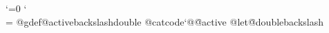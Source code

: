 \outer\def\bye{\pagealignmacro\tracingstats=1\ptexend}


\newcount\tempnum
\newcount\lnkcount
\newtoks\filename
\newcount\filenamelength
\newcount\pgn
\newtoks\toksA
\newtoks\toksB
\newtoks\toksC
\newtoks\toksD
\newbox\boxA
\newcount\countA
\newif\ifpdf
\newif\ifpdfmakepagedest

\ifx\pdfoutput\undefined
\else
  \ifx\pdfoutput\relax
  \else
    \ifcase\pdfoutput
    \else
      \pdftrue
    \fi
  \fi
\fi


% 
{\catcode`\@=0 \catcode`\\=\active
 @gdef@activebackslashdouble{%
   @catcode`@\=@active
   @let\=@doublebackslash}
}

% 
% 
\def\HyPsdSubst#1#2#3{%
  \def\HyPsdReplace##1#1##2\END{%
    ##1%
    \ifx\\##2\\%
    \else
      #2%
      \HyReturnAfterFi{%
        \HyPsdReplace##2\END
      }%
    \fi
  }%
  \xdef#3{\expandafter\HyPsdReplace#3#1\END}%
}
\long{}

\def\backslashparens#1{%
  \xdef#1{#1}%
  \HyPsdSubst{(}{\realbackslash(}{#1}%
  \HyPsdSubst{)}{\realbackslash)}{#1}%
}

